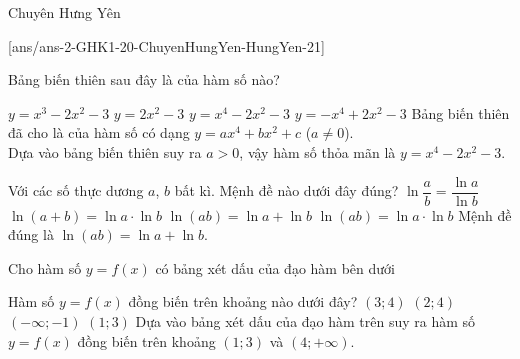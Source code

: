\begin{name}
	{\tenchude}
	{\tendethi}
	{Chuyên Hưng Yên}
	{\thoigian}
\end{name}
	\setcounter{ex}{0}\setcounter{bt}{0}
	[ans/ans-2-GHK1-20-ChuyenHungYen-HungYen-21]

\begin{ex}%
	Bảng biến thiên sau đây là của hàm số nào?
	\begin{center}
	\end{center}
	\choice
	{$y=x^3-2x^2-3$}
	{$y=2x^2-3$}
	{\True $y=x^4-2x^2-3$}
	{$y=-x^4+2x^2-3$}
	\loigiai
	{
		Bảng biến thiên đã cho là của hàm số có dạng $y=ax^4+bx^2+c$ ($a\ne0$).\\
		Dựa vào bảng biến thiên suy ra $a>0$, vậy hàm số thỏa mãn là $y=x^4-2x^2-3$.
	}
\end{ex}
\begin{ex}%
	Với các số thực dương $a$, $b$ bất kì. Mệnh đề nào dưới đây đúng?
	\choice
	{$\ln \dfrac{a}{b}=\dfrac{\ln a}{\ln b}$}
	{$\ln (a+b)=\ln a\cdot\ln b$}
	{\True $\ln (ab)=\ln a+\ln b$}
	{$\ln (ab)=\ln a\cdot\ln b$}
	\loigiai
	{
		Mệnh đề đúng là $\ln (ab)=\ln a+\ln b$.
	}
\end{ex}
\begin{ex}%
	Cho hàm số $y=f(x)$ có bảng xét dấu của đạo hàm bên dưới
	\begin{center}
	\end{center}
	Hàm số $y=f(x)$ đồng biến trên khoảng nào dưới đây?
	\choice
	{$(3;4)$}
	{$(2;4)$}
	{$(-\infty;-1)$}
	{\True $(1;3)$}
	\loigiai
	{
		Dựa vào bảng xét dấu của đạo hàm trên suy ra hàm số $y=f(x)$ đồng biến trên khoảng $(1;3)$ và $(4;+\infty)$.
	}
\end{ex}
